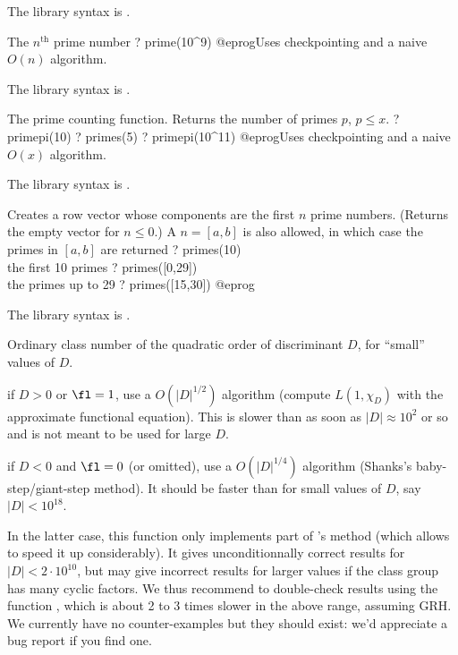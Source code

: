 The library syntax is .

\label{se:prime}
The $n^{\text{th}}$ prime number
\bprog
? prime(10^9)
@eprog\noindent Uses checkpointing and a naive $O(n)$ algorithm.

The library syntax is .

\label{se:primepi}
The prime counting function. Returns the number of
primes $p$, $p \leq x$.
\bprog
? primepi(10)
? primes(5)
? primepi(10^11)
@eprog\noindent Uses checkpointing and a naive $O(x)$ algorithm.

The library syntax is .

\label{se:primes}
Creates a row vector whose components are the first $n$ prime numbers.
(Returns the empty vector for $n \leq 0$.) A  $n = [a,b]$ is also
allowed, in which case the primes in $[a,b]$ are returned
\bprog
? primes(10)     \\ the first 10 primes
? primes([0,29])  \\ the primes up to 29
? primes([15,30])
@eprog

The library syntax is .

\label{se:qfbclassno}
Ordinary class number of the quadratic order of discriminant $D$, for
``small'' values of $D$.

\item if  $D > 0$ or $\fl = 1$, use a $O(|D|^{1/2})$
algorithm (compute $L(1,\chi_D)$ with the approximate functional equation).
This is slower than  as soon as $|D| \approx 10^2$ or
so and is not meant to be used for large $D$.

\item if $D < 0$ and $\fl = 0$ (or omitted), use a $O(|D|^{1/4})$
algorithm (Shanks's baby-step/giant-step method). It should
be faster than  for small values of $D$, say
$|D| < 10^{18}$.

 In the latter case, this function only
implements part of 's method (which allows to speed it up
considerably). It gives unconditionnally correct results for $|D| < 2\cdot
10^{10}$, but may give incorrect results for larger values if the class
group has many cyclic factors. We thus recommend to double-check results
using the function , which is about 2 to 3 times slower in
the above range, assuming GRH. We currently have no counter-examples but
they should exist: we'd appreciate a bug report if you find one.

